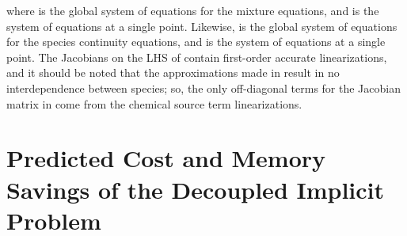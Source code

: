 where  is the global system of equations for the
mixture equations, and  is the system of equations at a single
point.  Likewise,  is the global system of
equations for the species continuity equations, and  is the
system of equations at a single point. The Jacobians on the LHS of
 contain first-order accurate
linearizations, and it should be noted that the approximations made in
 result in no interdependence between species; so, the only
off-diagonal terms for the Jacobian matrix in  come from the
chemical source term linearizations.

\section{Predicted Cost and Memory Savings of the Decoupled Implicit Problem}
\label{sec:predicted-cost-mem-savings}

